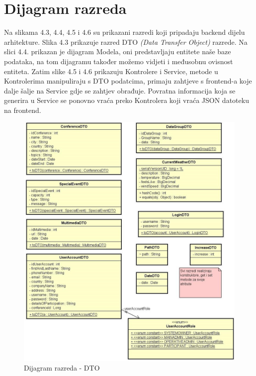 			\eject
			
			
		
			\section{Dijagram razreda}

			\text Na slikama 4.3, 4.4, 4.5 i 4.6 su prikazani razredi koji pripadaju backend dijelu arhitekture. Slika 4.3 prikazuje razred DTO \textit{(Data Transfer Object)} razrede.
			Na slici 4.4. prikazan je dijagram Modela, oni predstavljaju entitete naše baze podataka, na tom dijagramu također možemo vidjeti i međusobnu ovisnost entiteta. Zatim slike 4.5 i 4.6 prikazuju Kontrolere i Service, metode u Kontrolerima manipuliraju s DTO podatcima, primaju zahtjeve s frontend-a koje dalje šalje na Service gdje se zahtjev obrađuje. Povratna informacija koja se generira u Service se ponovno vraća preko Kontrolera koji vraća JSON datoteku na frontend. 
			

			\begin{figure}[H]
			\includegraphics[width=\textwidth]{slike/DTO Dijagram.jpg}
			\centering
			\caption{Dijagram razreda - DTO}
			\label{fig:}
			\end{figure}
			
